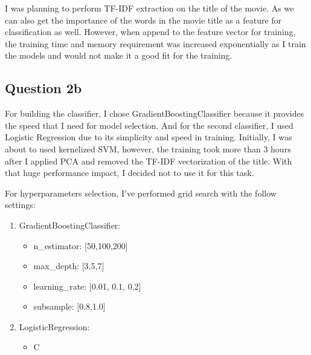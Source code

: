 \documentclass[a4paper]{article}
\begin{document}
I was planning to perform TF-IDF extraction on the title of the movie. As we can
also get the importance of the words in the movie title as a feature for
classification as well. However, when append to the feature vector for training, the 
training time and memory requirement was increased exponentially as I train the
models and would not make it a good fit for the training.

\subsection{Question 2b}
For building the classifier, I chose GradientBoostingClassifier because it
provides the speed that I need for model selection. And for the second
classifier, I used Logistic Regression due to its simplicity and speed in
training. Initially, I was about to used kernelized SVM, however, the training took more
than 3 hours after I applied PCA and removed the TF-IDF vectorization of the
title. With that huge performance impact, I decided not to use it for this task.

For hyperparameters selection, I've performed grid search with the follow
settings:
\begin{enumerate}
  \item GradientBoostingClassifier:
    \begin{itemize}
      \item n\_estimator: [50,100,200]
      \item max\_depth: [3,5,7]
      \item learning\_rate: [0.01, 0.1, 0.2]
      \item subsample: [0.8,1.0]
    \end{itemize}
  \item LogisticRegression:
    \begin{itemize}
      \item C\: [0.01, 0.1, 1, 10, 100]
    \end{itemize}
\end{enumerate}
\end{document}
